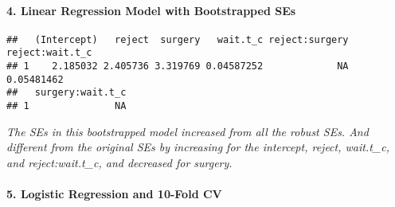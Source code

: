 \documentclass[]{article}
\newenvironment{Shaded}{\begin{snugshade}}{\end{snugshade}}
\newcommand{\DataTypeTok}[1]{\textcolor[rgb]{0.13,0.29,0.53}{#1}}
\newcommand{\DecValTok}[1]{\textcolor[rgb]{0.00,0.00,0.81}{#1}}
\newcommand{\KeywordTok}[1]{\textcolor[rgb]{0.13,0.29,0.53}{\textbf{#1}}}
\newcommand{\NormalTok}[1]{#1}
\newcommand{\OperatorTok}[1]{\textcolor[rgb]{0.81,0.36,0.00}{\textbf{#1}}}
\newcommand{\OtherTok}[1]{\textcolor[rgb]{0.56,0.35,0.01}{#1}}
\let\oldparagraph\paragraph
\renewcommand{\paragraph}[1]{\oldparagraph{#1}\mbox{}}
\begin{document}
\hypertarget{linear-regression-model-with-bootstrapped-ses}{%
\paragraph{4. Linear Regression Model with Bootstrapped
SEs}\label{linear-regression-model-with-bootstrapped-ses}}

\begin{Shaded}
\end{Shaded}

\begin{verbatim}
##   (Intercept)   reject  surgery   wait.t_c reject:surgery reject:wait.t_c
## 1    2.185032 2.405736 3.319769 0.04587252             NA      0.05481462
##   surgery:wait.t_c
## 1               NA
\end{verbatim}

\emph{The SEs in this bootstrapped model increased from all the robust
SEs. And different from the original SEs by increasing for the
intercept, reject, wait.t\_c, and reject:wait.t\_c, and decreased for
surgery.}

\hypertarget{logistic-regression-and-10-fold-cv}{%
\paragraph{5. Logistic Regression and 10-Fold
CV}\label{logistic-regression-and-10-fold-cv}}
\end{document}

